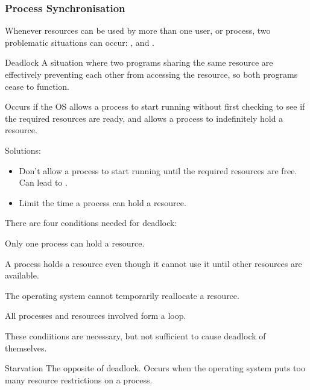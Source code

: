 \documentclass[\main/notes.tex]{subfiles}
\begin{document}
				\subsubsection{Process Synchronisation}
					Whenever resources can be used by more than one user, or process, two problematic situations can occur: , and .
					\begin{definition}{Deadlock}
						A situation where two programs sharing the same resource are effectively preventing each other from accessing the resource, so both programs cease to function.

						Occurs if the OS allows a process to start running without first checking to see if the required resources are ready, and allows a process to indefinitely hold a resource.

						Solutions:
						\begin{itemize}[nosep]
							\item Don't allow a process to start running until the required resources are free. Can lead to .
							\item Limit the time a process can hold a resource.
						\end{itemize}

						There are four conditions needed for deadlock:
						\begin{indentparagraph}
							\begin{description}[nosep]
								\item[Mutual exclusion] Only one process can hold a resource.
								\item[Resource holding] A process holds a resource even though it cannot use it until other resources are available.
								\item[No preemption] The operating system cannot temporarily reallocate a resource.
								\item[Circular waiting] All processes and resources involved form a loop.
							\end{description}
						\end{indentparagraph}
						These condiitions are necessary, but not sufficient to cause deadlock of themselves.
					\end{definition}
					\begin{definition}{Starvation}
						The opposite of deadlock. Occurs when the operating system puts too many resource restrictions on a process.
					\end{definition}
\end{document}
